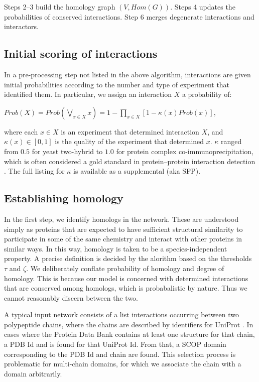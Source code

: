 \documentclass[12pt,twoside]{article}
\begin{document}
Steps 2--3 build the homology graph $(V, Hom(G))$. Steps 4 updates the probabilities of conserved interactions. Step 6 merges degenerate interactions and interactors.

\subsection{Initial scoring of interactions}

In a pre-processing step not listed in the above algorithm, interactions are given initial probabilities according to the number and type of experiment that identified them. In particular, we assign an interaction $X$ a probability of:

$Prob(X) = \displaystyle Prob \left( \bigvee_{x \in X} x \right) = 1 - \prod_{x \in X} \left[1 - \kappa(x) Prob(x) \right]$,

where each $x \in X$ is an experiment that determined interaction $X$, and $\kappa(x) \in [0,1]$ is the quality of the experiment that determined $x$. $\kappa$ ranged from $0.5$ for yeast two-hybrid to $1.0$ for protein complex co-immunoprecipitation, which is often considered a gold standard in protein--protein interaction detection \cite{kaboord}. The full listing for $\kappa$ is available as a supplemental (aka SFP).

\subsection{Establishing homology}

In the first step, we identify homologs in the network. These are understood simply as proteins that are expected to have sufficient structural similarity to participate in some of the same chemistry and interact with other proteins in similar ways. In this way, homology is taken to be a species-independent property. A precise definition is decided by the alorithm based on the thresholds $\tau$ and $\zeta$. We deliberately conflate probability of homology and degree of homology. This is because our model is concerned with determined interactions that are conserved among homologs, which is probabalistic by nature. Thus we cannot reasonably discern between the two.

A typical input network consists of a list interactions occurring between two polypeptide chains, where the chains are described by identifiers for UniProt \cite{uniprot}. In cases where the Protein Data Bank \cite{pdb} contains at least one structure for that chain, a PDB Id and is found for that UniProt Id. From that, a SCOP \cite{scop} domain corresponding to the PDB Id and chain are found. This selection process is problematic for multi-chain domains, for which we associate the chain with a domain arbitrarily.
\end{document}
